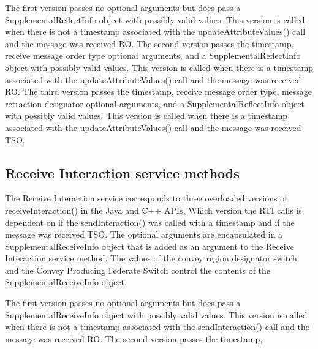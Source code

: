 \begin{compactstdpage}
    The first version passes no optional arguments but does pass a SupplementalReflectInfo object with possibly valid values. This version is called when there is not a timestamp associated with the updateAttributeValues() call and the message was received RO. The second version passes the timestamp, receive message order type optional arguments, and a SupplementalReflectInfo object with possibly valid values. This version is called when there is a timestamp associated with the updateAttributeValues() call and the message was received RO. The third version passes the timestamp, receive message order type, message retraction designator optional arguments, and a SupplementalReflectInfo object with possibly valid values. This version is called when there is a timestamp associated with the updateAttributeValues() call and the message was received TSO.

    \subsection{Receive Interaction service methods}

    The Receive Interaction service corresponds to three overloaded versions of receiveInteraction() in the Java and C++ APIs. Which version the RTI calls is dependent on if the sendInteraction() was called with a timestamp and if the message was received TSO. The optional arguments are encapsulated in a SupplementalReceiveInfo object that is added as an argument to the Receive Interaction service method. The values of the convey region designator switch and the Convey Producing Federate Switch control the contents of the SupplementalReceiveInfo object.

    The first version passes no optional arguments but does pass a SupplementalReceiveInfo object with possibly valid values. This version is called when there is not a timestamp associated with the sendInteraction() call and the message was received RO. The second version passes the timestamp,

\end{compactstdpage}

\clearpage

